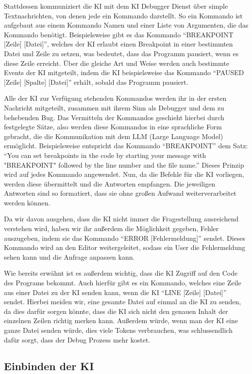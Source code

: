 \documentclass[a4paper,12pt,ngerman]{scrartcl}
\begin{document}
Stattdessen kommuniziert die KI mit dem KI Debugger Dienst über simple Textnachrichten, von denen jede ein Kommando darstellt. So ein Kommando ist aufgebaut aus einem Kommando Namen und einer Liste von Argumenten, die das Kommando benötigt. Beispielsweise gibt es das Kommando ``BREAKPOINT [Zeile] [Datei]'', welches der KI erlaubt einen Breakpoint in einer bestimmten Datei und Zeile zu setzen, was bedeutet, dass das Programm pausiert, wenn es diese Zeile erreicht. Über die gleiche Art und Weise werden auch bestimmte Events der KI mitgeteilt, indem die KI beispielsweise das Kommando ``PAUSED [Zeile] [Spalte] [Datei]'' erhält, sobald das Programm pausiert.

Alle der KI zur Verfügung stehenden Kommandos werden ihr in der ersten Nachricht mitgeteilt, zusammen mit ihrem Sinn als Debugger und dem zu behebenden Bug. Das Vermitteln der Kommandos geschieht hierbei durch festgelegte Sätze, also werden diese Kommandos in eine sprachliche Form gebracht, die die Kommunikation mit dem LLM (Large Language Model) ermöglicht. Beispielsweise entspricht das Kommando ``BREAKPOINT'' dem Satz: ``You can set breakpoints in the code by starting your message with "BREAKPOINT" followed by the line number and the file name.'' Dieses Prinzip wird auf jedes Kommando angewendet. Nun, da die Befehle für die KI vorliegen, werden diese übermittelt und die Antworten empfangen. Die jeweiligen Antworten sind so formatiert, dass sie ohne großen Aufwand weiterverarbeitet werden können.

Da wir davon ausgehen, dass die KI nicht immer die Fragestellung ausreichend verstehen wird, haben wir ihr außerdem die Möglichkeit gegeben, Fehler auszugeben, indem sie das Kommando ``ERROR [Fehlermeldung]'' sendet. Dieses Kommando wird an den Editor weitergeleitet, sodass ein User die Fehlermeldung sehen kann und die Anfrage anpassen kann.

Wie bereits erwähnt ist es außerdem wichtig, dass die KI Zugriff auf den Code des Programs bekommt. Auch hierfür gibt es ein Kommando, welches eine Zeile aus einer Datei zu der KI senden kann, wenn die KI ``LINE [Zeile] [Datei]'' sendet. Hierbei meiden wir, eine gesamte Datei auf einmal an die KI zu senden, da dies darfür sorgen könnte, dass die KI sich nicht den genauen Inhalt der einzelnen Zeilen richtig merken kann. Außerdem würde, wenn man der KI eine ganze Datei senden würde, dies viele Tokens verbrauchen, was schlussendlich dafür sorgt, dass der Debug Prozess mehr kostet.

\subsection{Einbinden der KI}
\end{document}
